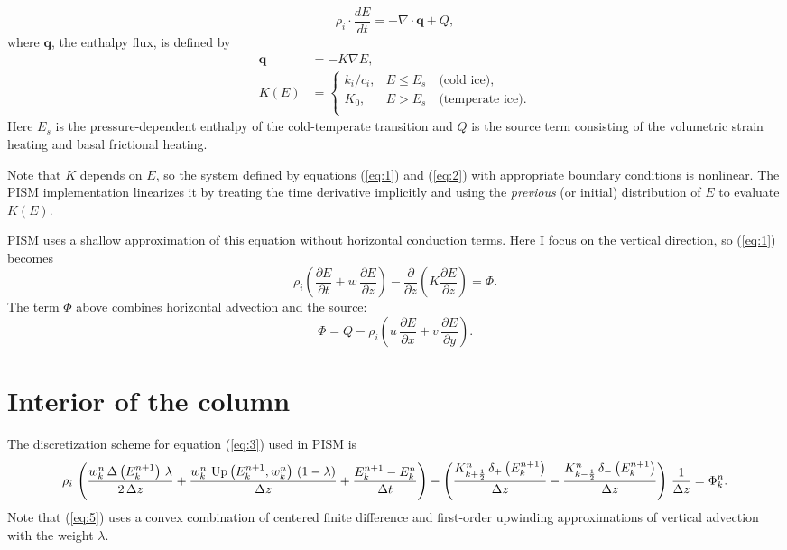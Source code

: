 \documentclass{article}
\newcommand{\diff}[2]{\frac{\partial #1}{\partial #2}}
\begin{document}
\begin{equation}
  \label{eq:1}
  \rho_{i} \cdot \frac{dE}{dt} = -\nabla\cdot\mathbf{q} + Q,
\end{equation}
where
$\mathbf{q}$, the enthalpy flux, is defined by
\begin{align}
  \label{eq:2}
  \mathbf{q} &= -K \nabla E,\\
  K(E) &=
  \begin{cases}
    k_{i}/c_{i}, & E \le E_{s}\quad\text{(cold ice)},\\
    K_{0}, & E > E_{s}\quad\text{(temperate ice)}.\\
  \end{cases}
\end{align}
Here $E_{s}$ is the pressure-dependent enthalpy of the cold-temperate
transition and $Q$ is the source term consisting of the volumetric
strain heating and basal frictional heating.

Note that $K$ depends on $E$, so the system defined by equations
(\ref{eq:1}) and (\ref{eq:2}) with appropriate boundary conditions is
nonlinear. The PISM implementation linearizes it by treating the time
derivative implicitly and using the \emph{previous} (or
initial) distribution of $E$ to evaluate $K(E)$.

PISM uses a shallow approximation of this equation without horizontal
conduction terms. Here I focus on the vertical direction, so
(\ref{eq:1}) becomes
\begin{equation}
  \label{eq:3}
  \rho_{i} \left( \diff{E}{t} + w\,\diff{E}{z} \right) - \diff{}{z}\left( K \diff{E}{z} \right) = \Phi.
\end{equation}
The term $\Phi$ above combines horizontal advection and the source:
\begin{equation}
  \label{eq:4}
    \Phi = Q - \rho_{i} \left( u\,\diff{E}{x} + v\,\diff{E}{y} \right).
\end{equation}

\section{Interior of the column}
\label{sec:interior}

The discretization scheme for equation (\ref{eq:3}) used in PISM is
\begin{equation}
  \label{eq:5}
  \rho_{i}\,\left(\frac{w^{n}_{k}\,\Delta\left(E^{n+1}_{k}\right)\,\lambda}{2\,\Delta z}+\frac{w^{n}_{k}\,\operatorname{Up}\left(E^{n+1}_{k} , w^{n}_{k}\right)\,\left(1-\lambda\right)}{\Delta z}+\frac{E^{n+1}_{k}-E^{n}_{k}}{\Delta t}\right)-\left(\frac{K^{n}_{k+\frac{1}{2}}\,\mathbf{\delta}_{+}\left(E^{n+1}_{k}\right)}{\Delta z}-\frac{K^{n}_{k-\frac{1}{2}}\,\mathbf{\delta}_{-}\left(E^{n+1}_{k}\right)}{\Delta z}\right)\,\frac{1}{\Delta z}=\Phi^{n}_{k}.
\end{equation}
Note that (\ref{eq:5}) uses a convex combination of centered finite
difference and first-order upwinding approximations of vertical
advection with the weight $\lambda$.
\end{document}

